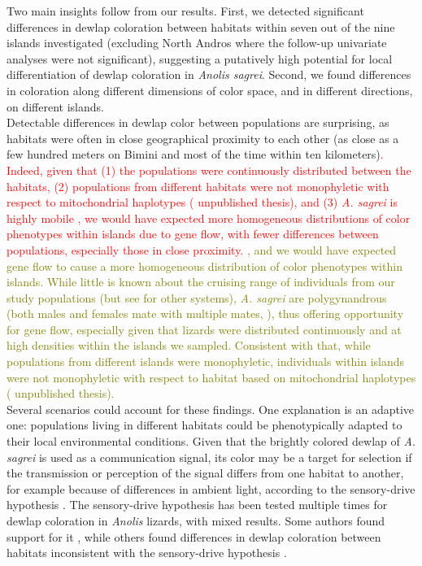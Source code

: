 Two main insights follow from our results. First, we detected significant differences in dewlap coloration between habitats within seven out of the nine islands investigated (excluding North Andros where the follow-up univariate analyses were not significant), suggesting a putatively high potential for local differentiation of dewlap coloration in \textit{Anolis sagrei}. Second, we found differences in coloration along different dimensions of color space, and in different directions, on different islands.\\

Detectable differences in dewlap color between populations are surprising, as habitats were often in close geographical proximity to each other (as close as a few hundred meters on Bimini and most of the time within ten kilometers)\textcolor{red}{. Indeed, given that (1) the populations were continuously distributed between the habitats, (2) populations from different habitats were not monophyletic with respect to mitochondrial haplotypes (\citealt{vandeSchoot2016} unpublished thesis), and (3) \textit{A. sagrei} is highly mobile \citep{Kamath2018}, we would have expected more homogeneous distributions of color phenotypes within islands due to gene flow, with fewer differences between populations, especially those in close proximity.} \textcolor{olive}{, and we would have expected gene flow to cause a more homogeneous distribution of color phenotypes within islands. While little is known about the cruising range of individuals from our study populations (but see \citealt{Steinberg2017, Kamath2018} for other systems), \textit{A. sagrei} are polygynandrous (both males and females mate with multiple mates, \citealt{Kamath2017, Kamath2018a, Kamath2018}), thus offering opportunity for gene flow, especially given that lizards were distributed continuously and at high densities within the islands we sampled. Consistent with that, while populations from different islands were monophyletic, individuals within islands were not monophyletic with respect to habitat based on mitochondrial haplotypes (\citealt{vandeSchoot2016} unpublished thesis).}\\

Several scenarios could account for these findings. One explanation is an adaptive one: populations living in different habitats could be phenotypically adapted to their local environmental conditions. Given that the brightly colored dewlap of \textit{A. sagrei} is used as a communication signal, its color may be a target for selection if the transmission or perception of the signal differs from one habitat to another, for example because of differences in ambient light, according to the sensory-drive hypothesis \citep{Endler1988, Endler1992, Endler1998}. The sensory-drive hypothesis has been tested multiple times for dewlap coloration in \textit{Anolis} lizards, with mixed results. Some authors found support for it \citep{Leal2002, Leal2004}, while others found differences in dewlap coloration between habitats inconsistent with the sensory-drive hypothesis \citep{Fleishman2009, Ng2012}.\\

